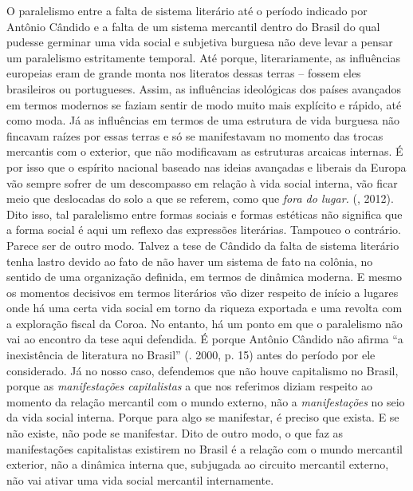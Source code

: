 O paralelismo entre a falta de sistema literário até o período indicado
por Antônio Cândido e a falta de um sistema mercantil dentro do Brasil
do qual pudesse germinar uma vida social e subjetiva burguesa não deve
levar a pensar um paralelismo estritamente temporal. Até porque,
literariamente, as influências europeias eram de grande monta nos
literatos dessas terras -- fossem eles brasileiros ou portugueses.
Assim, as influências ideológicas dos países avançados em termos
modernos se faziam sentir de modo muito mais explícito e rápido, até
como moda. Já as influências em termos de uma estrutura de vida burguesa
não fincavam raízes por essas terras e só se manifestavam no momento das
trocas mercantis com o exterior, que não modificavam as estruturas
arcaicas internas. É por isso que o espírito nacional baseado nas ideias
avançadas e liberais da Europa vão sempre sofrer de um descompasso em
relação à vida social interna, vão ficar meio que deslocadas do solo a
que se referem, como que \emph{fora do lugar.} (, 2012). Dito
isso, tal paralelismo entre formas sociais e formas estéticas não
significa que a forma social é aqui um reflexo das expressões
literárias. Tampouco o contrário. Parece ser de outro modo. Talvez a
tese de Cândido da falta de sistema literário tenha lastro devido ao
fato de não haver um sistema de fato na colônia, no sentido de uma
organização definida, em termos de dinâmica moderna. E mesmo os momentos
decisivos em termos literários vão dizer respeito de início a lugares
onde há uma certa vida social em torno da riqueza exportada e uma
revolta com a exploração fiscal da Coroa. No entanto, há um ponto em que
o paralelismo não vai ao encontro da tese aqui defendida. É porque
Antônio Cândido não afirma ``a inexistência de literatura no Brasil''
(. 2000, p. 15) antes do período por ele considerado. Já no nosso
caso, defendemos que não houve capitalismo no Brasil, porque as
\emph{manifestações capitalistas} a que nos referimos diziam respeito ao
momento da relação mercantil com o mundo externo, não a
\emph{manifestações} no seio da vida social interna. Porque para algo se
manifestar, é preciso que exista. E se não existe, não pode se
manifestar. Dito de outro modo, o que faz as manifestações capitalistas
existirem no Brasil é a relação com o mundo mercantil exterior, não a
dinâmica interna que, subjugada ao circuito mercantil externo, não vai
ativar uma vida social mercantil internamente.

